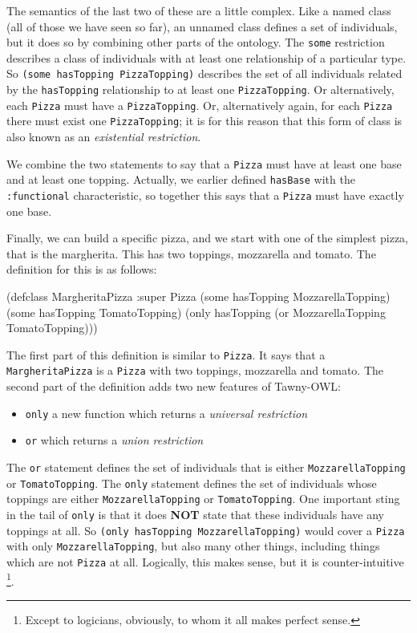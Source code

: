 \documentclass[11pt]{article}
\begin{document}
The semantics of the last two of these are a little complex. Like a named
class (all of those we have seen so far), an unnamed class defines a set of
individuals, but it does so by combining other parts of the ontology. The
\verb~some~ restriction describes a class of individuals with at least one
relationship of a particular type. So \verb~(some hasTopping PizzaTopping)~
describes the set of all individuals related by the \verb~hasTopping~ relationship
to at least one \verb~PizzaTopping~. Or alternatively, each \verb~Pizza~ must have a
\verb~PizzaTopping~. Or, alternatively again, for each \verb~Pizza~ there must exist one
\verb~PizzaTopping~; it is for this reason that this form of class is also known as
an \emph{existential restriction}.

We combine the two statements to say that a \verb~Pizza~ must have at least one
base and at least one topping. Actually, we earlier defined \verb~hasBase~ with the
\verb~:functional~ characteristic, so together this says that a \verb~Pizza~ must have
exactly one base.

Finally, we can build a specific pizza, and we start with one of the simplest
pizza, that is the margherita. This has two toppings, mozzarella and tomato.
The definition for this is as follows:

\begin{tawny}
(defclass MargheritaPizza
  :super
  Pizza
  (some hasTopping MozzarellaTopping)
  (some hasTopping TomatoTopping)
  (only hasTopping (or MozzarellaTopping TomatoTopping)))
\end{tawny}

The first part of this definition is similar to \verb~Pizza~. It says that a
\verb~MargheritaPizza~ is a \verb~Pizza~ with two toppings, mozzarella and tomato. The
second part of the definition adds two new features of Tawny-OWL:

\begin{itemize}
\item \verb~only~ a new function which returns a \emph{universal restriction}
\item \verb~or~ which returns a \emph{union restriction}
\end{itemize}

The \verb~or~ statement defines the set of individuals that is either
\verb~MozzarellaTopping~ or \verb~TomatoTopping~. The \verb~only~ statement defines the set
of individuals whose toppings are either \verb~MozzarellaTopping~ or
\verb~TomatoTopping~. One important sting in the tail of \verb~only~ is that it does
\textbf{NOT} state that these individuals have any toppings at all. So \verb~(only hasTopping MozzarellaTopping)~ would cover a \verb~Pizza~ with only
\verb~MozzarellaTopping~, but also many other things, including things which are
not \verb~Pizza~ at all. Logically, this makes sense, but it is counter-intuitive
\footnote{Except to logicians, obviously, to whom it all makes perfect sense.}.
\end{document}
